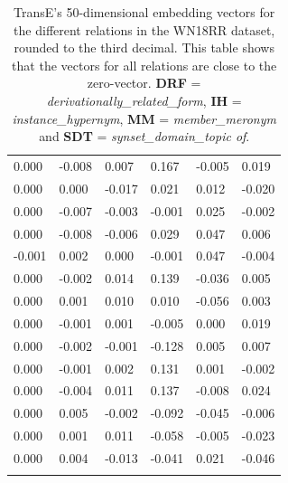 \begin{longtable}{llllll}
0.000        & -0.008             & 0.007             & 0.167       & -0.005      & 0.019        \\
0.000        & 0.000              & -0.017            & 0.021       & 0.012       & -0.020       \\
0.000        & -0.007             & -0.003            & -0.001      & 0.025       & -0.002       \\
0.000        & -0.008             & -0.006            & 0.029       & 0.047       & 0.006        \\
-0.001       & 0.002              & 0.000             & -0.001      & 0.047       & -0.004       \\
0.000        & -0.002             & 0.014             & 0.139       & -0.036      & 0.005        \\
0.000        & 0.001              & 0.010             & 0.010       & -0.056      & 0.003        \\
0.000        & -0.001             & 0.001             & -0.005      & 0.000       & 0.019        \\
0.000        & -0.002             & -0.001            & -0.128      & 0.005       & 0.007        \\
0.000        & -0.001             & 0.002             & 0.131       & 0.001       & -0.002       \\
0.000        & -0.004             & 0.011             & 0.137       & -0.008      & 0.024        \\
0.000        & 0.005              & -0.002            & -0.092      & -0.045      & -0.006       \\
0.000        & 0.001              & 0.011             & -0.058      & -0.005      & -0.023       \\
0.000        & 0.004              & -0.013            & -0.041      & 0.021       & -0.046      \\ \hline
\caption{TransE's 50-dimensional embedding vectors for the different relations in the WN18RR dataset, rounded to the third decimal. This table shows that the vectors for all relations are close to the zero-vector. \textbf{DRF} = \textit{derivationally\_related\_form}, \textbf{IH} = \textit{instance\_hypernym}, \textbf{MM} = \textit{member\_meronym} and \textbf{SDT} = \textit{synset\_domain\_topic of}.}
\label{TransE_embedding_WN18RR}
\end{longtable}

